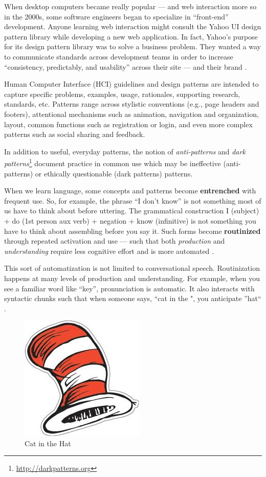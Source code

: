 When desktop computers became really popular --- and web interaction more so in the 2000s, some software engineers began to specialize in ``front-end'' development. Anyone learning web interaction might consult the Yahoo UI design pattern library while developing a new web application. In fact, Yahoo's purpose for its design pattern library was to solve a business problem. They wanted a way to communicate standards across development teams in order to increase ``consistency, predictably, and usability'' across their site --- and their brand  \citep{Leacock:2005ut}. 

Human Computer Interface (HCI) guidelines and design patterns are intended to capture specific problems, examples, usage, rationales, supporting research, standards, etc. Patterns range across stylistic conventions (e.g., page headers and footers), attentional mechanisms such as animation, navigation and organization, layout, common functions such as registration or login, and even more complex patterns such as social sharing and feedback. 

In addition to useful, everyday patterns, the notion of \emph{anti-patterns} and  \textit{dark patterns}\footnote{\url{http://darkpatterns.org}}  document practice in common use which may be ineffective (anti-patterns) or ethically questionable (dark patterns) patterns.

When we learn language, some concepts and patterns become \textbf{entrenched} with frequent use. So, for example, the phrase ``I don't know'' is not something most of us have to think about before uttering. The grammatical construction I (subject) + do (1st person aux verb) + negation + know (infinitive) is not something you have to think about assembling before you say it. Such forms become \textbf{routinized} through repeated activation and use --- such that both \emph{production} and \emph{understanding} require less cognitive effort and is more automated  \citep{Pickering:2003uy}. 

This sort of automatization is not limited to conversational speech. Routinization happens at many levels of production and understanding. For example, when you see a familiar word like ``key'', pronunciation is automatic. It also interacts with syntactic chunks such that when someone says, ``cat in the  \underline{   }",  you anticipate ''hat``  \citep{Pickering:2003uy}. \\

\begin{figure}
\centerline{
\includegraphics[scale=.5]{chapter8.tex/cathat}
}
\caption{Cat in the Hat}
\label{cathat}
\end{figure}

